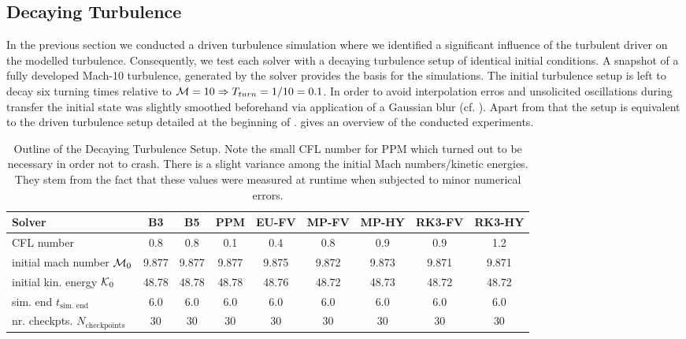 \subsection{Decaying Turbulence}
\label{sec:decayturb}

In the previous section we conducted a driven turbulence simulation where we
identified a significant influence of the turbulent driver on the modelled
turbulence. Consequently, we test each solver with a decaying turbulence setup
of identical initial conditions. A snapshot of a fully developed Mach-10
turbulence, generated by the \bouF solver provides the basis for the
simulations. The initial turbulence setup is left to decay six turning times
relative to $\mathcal{M} = 10 \Rightarrow T_{turn} = 1/10 = 0.1$. In order to avoid
interpolation erros and unsolicited oscillations during transfer the initial
state was slightly smoothed beforehand via application of a Gaussian blur (cf.
). Apart from that the setup
is equivalent to the driven turbulence setup detailed at the beginning of
.  gives an overview of the conducted
experiments.
\begin{table}[H]
\fontsize{3mm}{3mm}\selectfont
\caption{Outline of the Decaying Turbulence Setup. Note the small CFL number
for PPM which turned out to be necessary in order not to crash. There is a
slight variance among the initial Mach numbers/kinetic energies. They stem from
the fact that these values were measured at runtime when
subjected to minor numerical errors.}
\centering
\begin{tabular}{l| cccc cccc}
\toprule
Solver                          & B3 & B5 & PPM & EU-FV & MP-FV & MP-HY & RK3-FV & RK3-HY \\
\midrule
CFL number                            & 0.8 & 0.8 & 0.1 & 0.4 & 0.8 & 0.9 & 0.9 & 1.2 \\ 
initial mach number $\mathcal{M}_0$   & 9.877 & 9.877 & 9.877 & 9.875 & 9.872 & 9.873 & 9.871 & 9.871 \\
initial kin. energy $\mathcal{K}_0$   & 48.78 & 48.78 & 48.78 & 48.76 & 48.72 & 48.73 & 48.72 & 48.72 \\
sim. end $t_{\text{sim. end}}$           & 6.0 & 6.0 & 6.0 & 6.0 & 6.0 & 6.0 & 6.0 & 6.0 \\
nr. checkpts. $N_{\text{checkpoints}}$        & 30 & 30 & 30 & 30 & 30 & 30 & 30 & 30 \\
\bottomrule
\end{tabular}
\label{tab:setup-decayturb}
\end{table}

